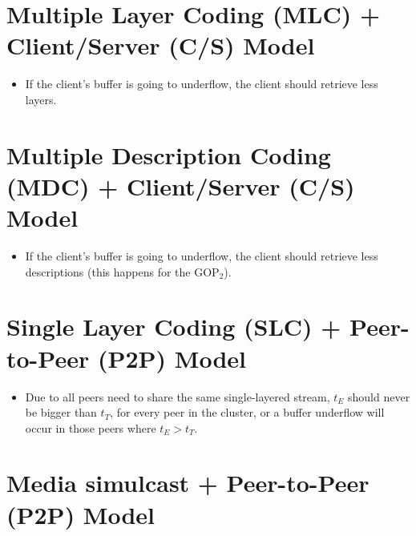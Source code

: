 
\section{Multiple Layer Coding (MLC) + Client/Server (C/S) Model}


\begin{itemize}
\item If the client's buffer is going to underflow, the client should
  retrieve less layers.
\end{itemize}


\section{Multiple Description Coding (MDC) + Client/Server (C/S) Model}


\begin{itemize}
\item If the client's buffer is going to underflow, the client should
  retrieve less descriptions (this happens for the GOP$_2$).
\end{itemize}


\section{Single Layer Coding (SLC) + Peer-to-Peer (P2P) Model}

\begin{itemize}
\item Due to all peers need to share the same single-layered stream,
  $t_E$ should never be bigger than $t_T$, for every peer in the cluster,
  or a buffer underflow will occur in those peers where $t_E>t_T$.
\end{itemize}


\section{Media simulcast + Peer-to-Peer (P2P) Model}

